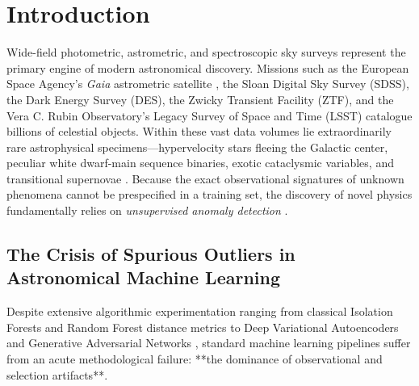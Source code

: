 \documentclass[10pt,a4paper]{article}
\begin{document}
\section{Introduction}
\label{sec:intro}

Wide-field photometric, astrometric, and spectroscopic sky surveys represent the primary engine of modern astronomical discovery. Missions such as the European Space Agency's \textit{Gaia} astrometric satellite \citep{gaiadr32023}, the Sloan Digital Sky Survey (SDSS), the Dark Energy Survey (DES), the Zwicky Transient Facility (ZTF), and the Vera C. Rubin Observatory's Legacy Survey of Space and Time (LSST) catalogue billions of celestial objects. Within these vast data volumes lie extraordinarily rare astrophysical specimens---hypervelocity stars fleeing the Galactic center, peculiar white dwarf-main sequence binaries, exotic cataclysmic variables, and transitional supernovae \citep{baron2017weirdest, pruzhinskaya2019anomaly, malanchev2021ztf}. Because the exact observational signatures of unknown phenomena cannot be prespecified in a training set, the discovery of novel physics fundamentally relies on \textit{unsupervised anomaly detection} \citep{lochner2021astronomaly, baron2019critical}.

\subsection{The Crisis of Spurious Outliers in Astronomical Machine Learning}
Despite extensive algorithmic experimentation ranging from classical Isolation Forests \citep{giles2019kepler} and Random Forest distance metrics \citep{baron2017weirdest, reis2018outlier} to Deep Variational Autoencoders \citep{villar2020vae} and Generative Adversarial Networks \citep{prochaska2019gan}, standard machine learning pipelines suffer from an acute methodological failure: **the dominance of observational and selection artifacts**.
\end{document}
